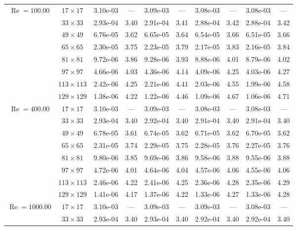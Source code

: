 \documentclass[preprint, 12pt]{elsarticle}
\begin{document}
\begin{center}
\begin{table}[H]
{\begin{tabular*}{\textwidth}{@{\extracolsep\fill}cccccccccc@{}}
    \hline
    \multirow{7}{*}{$\operatorname{Re}=100.00$} & $17\times 17$ & 3.10e-03 & --- & 3.09e-03 & --- & 3.08e-03 & --- & 3.08e-03 & --- \\
    & $33\times 33$ & 2.93e-04 & 3.40 & 2.91e-04 & 3.41 & 2.88e-04 & 3.42 & 2.88e-04 & 3.42 \\
    & $49\times 49$ & 6.76e-05 & 3.62 & 6.65e-05 & 3.64 & 6.54e-05 & 3.66 & 6.51e-05 & 3.66 \\
    \multirow{3}{*}{$\operatorname{Wi}=5$} & $65\times 65$ & 2.30e-05 & 3.75 & 2.23e-05 & 3.79 & 2.17e-05 & 3.83 & 2.16e-05 & 3.84 \\
    & $81\times 81$ & 9.72e-06 & 3.86 & 9.28e-06 & 3.93 & 8.88e-06 & 4.01 & 8.79e-06 & 4.02 \\
    & $97\times 97$ & 4.66e-06 & 4.03 & 4.36e-06 & 4.14 & 4.09e-06 & 4.25 & 4.03e-06 & 4.27 \\
    & $113\times 113$ & 2.42e-06 & 4.25 & 2.21e-06 & 4.41 & 2.03e-06 & 4.55 & 1.99e-06 & 4.58 \\
    & $129\times 129$ & 1.38e-06 & 4.22 & 1.22e-06 & 4.46 & 1.09e-06 & 4.67 & 1.06e-06 & 4.71 \\
    \hline
    \multirow{7}{*}{$\operatorname{Re}=400.00$} & $17\times 17$ & 3.10e-03 & --- & 3.09e-03 & --- & 3.08e-03 & --- & 3.08e-03 & --- \\
    & $33\times 33$ & 2.93e-04 & 3.40 & 2.92e-04 & 3.40 & 2.91e-04 & 3.40 & 2.91e-04 & 3.40 \\
    & $49\times 49$ & 6.78e-05 & 3.61 & 6.74e-05 & 3.62 & 6.71e-05 & 3.62 & 6.70e-05 & 3.62 \\
    \multirow{3}{*}{$\operatorname{Wi}=5$} & $65\times 65$ & 2.31e-05 & 3.74 & 2.29e-05 & 3.75 & 2.28e-05 & 3.76 & 2.27e-05 & 3.76 \\
    & $81\times 81$ & 9.80e-06 & 3.85 & 9.69e-06 & 3.86 & 9.58e-06 & 3.88 & 9.55e-06 & 3.88 \\
    & $97\times 97$ & 4.72e-06 & 4.01 & 4.64e-06 & 4.04 & 4.57e-06 & 4.06 & 4.55e-06 & 4.06 \\
    & $113\times 113$ & 2.46e-06 & 4.22 & 2.41e-06 & 4.25 & 2.36e-06 & 4.28 & 2.35e-06 & 4.29 \\
    & $129\times 129$ & 1.41e-06 & 4.17 & 1.37e-06 & 4.22 & 1.33e-06 & 4.27 & 1.33e-06 & 4.28 \\
    \hline
    \multirow{7}{*}{$\operatorname{Re}=1000.00$} & $17\times 17$ & 3.10e-03 & --- & 3.09e-03 & --- & 3.09e-03 & --- & 3.08e-03 & --- \\
    & $33\times 33$ & 2.93e-04 & 3.40 & 2.93e-04 & 3.40 & 2.92e-04 & 3.40 & 2.92e-04 & 3.40 \\

\end{tabular*}}
\end{table}
\end{center}
\end{document}
